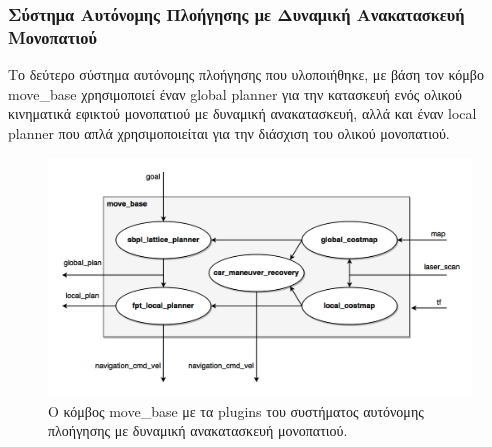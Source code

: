 \subsubsection{Σύστημα Αυτόνομης Πλοήγησης με Δυναμική Ανακατασκευή Μονοπατιού}
Το δεύτερο σύστημα αυτόνομης πλοήγησης που υλοποιήθηκε, με βάση τον κόμβο move{\_}base χρησιμοποιεί έναν global planner για την κατασκευή ενός ολικού κινηματικά εφικτού μονοπατιού με δυναμική ανακατασκευή, αλλά και έναν local planner που απλά χρησιμοποιείται για την διάσχιση του ολικού μονοπατιού.

\begin{figure}[!ht]
	\centering
	\includegraphics[width=\linewidth]{Chapters/Chapter4/Figures/navigation_2_plugins.png}
	\caption{Ο κόμβος move{\_}base με τα plugins του συστήματος αυτόνομης πλοήγησης με δυναμική ανακατασκευή μονοπατιού.}
	\label{fig:navigation_2_plugins}
\end{figure}

